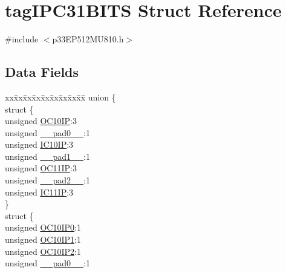 \hypertarget{structtag_i_p_c31_b_i_t_s}{}\section{tag\+I\+P\+C31\+B\+I\+TS Struct Reference}
\label{structtag_i_p_c31_b_i_t_s}


{\ttfamily \#include $<$p33\+E\+P512\+M\+U810.\+h$>$}

\subsection*{Data Fields}
\begin{DoxyCompactItemize}
\item 
\begin{tabbing}
xx\=xx\=xx\=xx\=xx\=xx\=xx\=xx\=xx\=\kill
union \{\\
\>struct \{\\
\>\>unsigned \hyperlink{structtag_i_p_c31_b_i_t_s_a6f3987df5c5fcdc314b54debf1905009}{OC10IP}:3\\
\>\>unsigned \hyperlink{structtag_i_p_c31_b_i_t_s_adf71f3d8410c1f1dbbc96680a92c49af}{\_\_pad0\_\_}:1\\
\>\>unsigned \hyperlink{structtag_i_p_c31_b_i_t_s_a789ededf6ff8c166361682fd6b1a818f}{IC10IP}:3\\
\>\>unsigned \hyperlink{structtag_i_p_c31_b_i_t_s_acaf2d0924a107ec6e8d2e31febaf66f9}{\_\_pad1\_\_}:1\\
\>\>unsigned \hyperlink{structtag_i_p_c31_b_i_t_s_ace1b7fa91637358ab6ffe30fca1ff1b2}{OC11IP}:3\\
\>\>unsigned \hyperlink{structtag_i_p_c31_b_i_t_s_a4d97cc5f7d51d22fc2bf3eab35c9cb7f}{\_\_pad2\_\_}:1\\
\>\>unsigned \hyperlink{structtag_i_p_c31_b_i_t_s_ab9bdc59e8592427a24958de7daa8e66d}{IC11IP}:3\\
\>\} \\
\>struct \{\\
\>\>unsigned \hyperlink{structtag_i_p_c31_b_i_t_s_a2a710c04b7d91eb31f1ede4b0bb5dbea}{OC10IP0}:1\\
\>\>unsigned \hyperlink{structtag_i_p_c31_b_i_t_s_aef4ab877112678502ece2c2f182e9f34}{OC10IP1}:1\\
\>\>unsigned \hyperlink{structtag_i_p_c31_b_i_t_s_a4d2a9c5eeee3e722d7f54be544698453}{OC10IP2}:1\\
\>\>unsigned \hyperlink{structtag_i_p_c31_b_i_t_s_adf71f3d8410c1f1dbbc96680a92c49af}{\_\_pad0\_\_}:1\\

\end{tabbing}
\end{DoxyCompactItemize}
